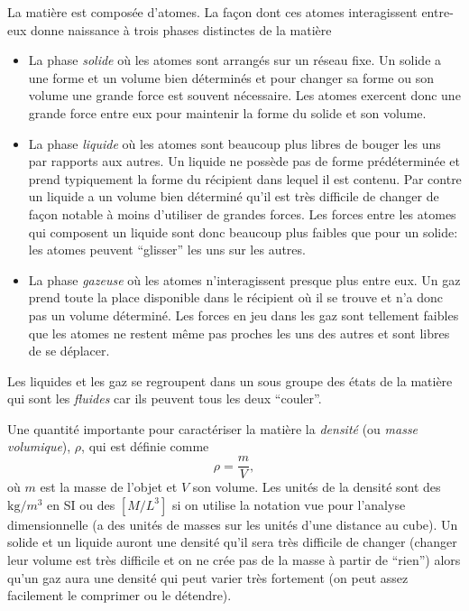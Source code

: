 \documentclass[a4paper,12pt]{book}
\newcommand{\kg}{\mathrm{kg}}
\begin{document}
La matière est composée d'atomes. La façon dont ces atomes interagissent entre-eux donne naissance à
trois phases distinctes de la matière
\begin{itemize}
 \item La phase \textit{solide} où les atomes sont arrangés sur un réseau fixe. Un solide a une forme et un volume bien déterminés et pour
 changer sa forme ou son volume une grande force est souvent nécessaire. Les atomes exercent donc une grande force entre eux pour maintenir 
 la forme du solide et son volume.
 \item La phase \textit{liquide} où les atomes sont beaucoup plus libres de bouger les uns par rapports aux autres. Un liquide ne possède pas
 de forme prédéterminée et prend typiquement la forme du récipient dans lequel il est contenu. Par contre un liquide a un volume bien déterminé
 qu'il est très difficile de changer de façon notable à moins d'utiliser de grandes forces. 
 Les forces entre les atomes qui composent un liquide sont donc beaucoup
 plus faibles que pour un solide: les atomes peuvent ``glisser'' les uns sur les autres.
 \item La phase \textit{gazeuse} où les atomes n’interagissent presque plus entre eux. Un gaz prend toute la place disponible dans le récipient où il se trouve
 et n'a donc pas un volume déterminé. Les forces en jeu dans les gaz sont tellement faibles que les atomes ne restent même pas proches les uns
 des autres et sont libres de se déplacer.
\end{itemize}
Les liquides et les gaz se regroupent dans un sous groupe des états de la matière qui sont les \textit{fluides} car ils peuvent tous les deux ``couler''.

Une quantité importante pour caractériser la matière la \textit{densité} (ou \textit{masse volumique}), $\rho$, qui est définie comme
\begin{equation}
 \rho=\frac{m}{V},
\end{equation}
où $m$ est la masse de l'objet et $V$ son volume. Les unités de la densité sont des $\kg/m^3$ en SI ou des $[M/L^3]$ si on utilise la notation vue pour 
l'analyse dimensionnelle (a des unités de masses sur les unités d'une distance au cube). 
Un solide et un liquide auront une densité qu'il sera très difficile de changer (changer leur volume est
très difficile et on ne crée pas de la masse à partir de ``rien'') 
alors qu'un gaz aura une densité qui peut varier très fortement (on peut assez facilement le comprimer ou le détendre).
\end{document}
